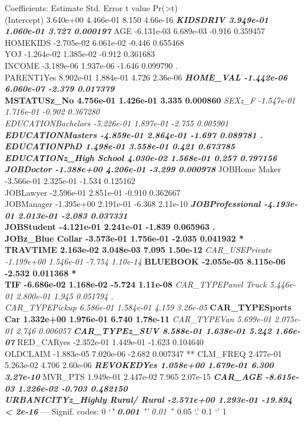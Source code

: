 \documentclass[]{article}
\begin{document}
Coefficients: Estimate Std. Error t value
Pr(\textgreater{}\textbar{}t\textbar{})\\
(Intercept) 3.640e+00 4.466e-01 8.150 4.66e-16 \textbf{\emph{ KIDSDRIV
3.949e-01 1.060e-01 3.727 0.000197 }} AGE -6.131e-03 6.689e-03 -0.916
0.359457\\
HOMEKIDS -2.705e-02 6.061e-02 -0.446 0.655468\\
YOJ -1.264e-02 1.385e-02 -0.912 0.361683\\
INCOME -3.189e-06 1.937e-06 -1.646 0.099790 .\\
PARENT1Yes 8.902e-01 1.884e-01 4.726 2.36e-06 \textbf{\emph{ HOME\_VAL
-1.442e-06 6.060e-07 -2.379 0.017379 }\\
MSTATUSz\_No 4.756e-01 1.426e-01 3.335 0.000860 }\emph{ SEXz\_F
-1.547e-01 1.716e-01 -0.902 0.367280\\
EDUCATIONBachelors -5.226e-01 1.897e-01 -2.755 0.005901 \textbf{
EDUCATIONMasters -4.859e-01 2.864e-01 -1.697 0.089781 .\\
EDUCATIONPhD 1.498e-01 3.558e-01 0.421 0.673785\\
EDUCATIONz\_High School 4.030e-02 1.568e-01 0.257 0.797156\\
JOBDoctor -1.388e+00 4.206e-01 -3.299 0.000978 }} JOBHome Maker
-3.566e-01 2.325e-01 -1.534 0.125162\\
JOBLawyer -2.596e-01 2.851e-01 -0.910 0.362667\\
JOBManager -1.395e+00 2.191e-01 -6.368 2.11e-10 \textbf{\emph{
JOBProfessional -4.193e-01 2.013e-01 -2.083 0.037331 }\\
JOBStudent -4.121e-01 2.241e-01 -1.839 0.065963 .\\
JOBz\_Blue Collar -3.573e-01 1.756e-01 -2.035 0.041932 *\\
TRAVTIME 2.163e-02 3.048e-03 7.095 1.50e-12 }\emph{ CAR\_USEPrivate
-1.199e+00 1.546e-01 -7.754 1.10e-14 }\textbf{ BLUEBOOK -2.055e-05
8.115e-06 -2.532 0.011368 *\\
TIF -6.686e-02 1.168e-02 -5.724 1.11e-08 }\emph{ CAR\_TYPEPanel Truck
5.446e-01 2.800e-01 1.945 0.051794 .\\
CAR\_TYPEPickup 6.586e-01 1.584e-01 4.159 3.26e-05 }\textbf{
CAR\_TYPESports Car 1.332e+00 1.976e-01 6.740 1.78e-11 }\emph{
CAR\_TYPEVan 5.699e-01 2.075e-01 2.746 0.006057 \textbf{ CAR\_TYPEz\_SUV
8.588e-01 1.638e-01 5.242 1.66e-07 }} RED\_CARyes -2.352e-01 1.449e-01
-1.623 0.104640\\
OLDCLAIM -1.883e-05 7.020e-06 -2.682 0.007347 ** CLM\_FREQ 2.477e-01
5.263e-02 4.706 2.60e-06 \textbf{\emph{ REVOKEDYes 1.058e+00 1.679e-01
6.300 3.27e-10 }} MVR\_PTS 1.949e-01 2.447e-02 7.965 2.07e-15
\textbf{\emph{ CAR\_AGE -8.615e-03 1.226e-02 -0.703 0.482150\\
URBANICITYz\_Highly Rural/ Rural -2.571e+00 1.293e-01 -19.894
\textless{} 2e-16 }} --- Signif. codes: 0 `\emph{\textbf{' 0.001 '}'
0.01 '}' 0.05 `.' 0.1 `' 1
\end{document}
